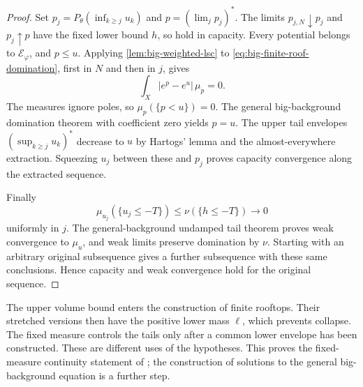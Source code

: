 \begin{proof}
Set $p_j=P_\theta(\inf_{k\geq j}u_k)$ and $p=(\lim_jp_j)^*$. The limits $p_{j,N}\downarrow p_j$ and $p_j\uparrow p$ have the fixed lower bound $h$, so hold in capacity. Every potential belongs to $\mathcal E_\varphi$, and $p\leq u$. Applying \cref{lem:big-weighted-lsc} to \eqref{eq:big-finite-roof-domination}, first in $N$ and then in $j$, gives
\[
 \int_X|e^p-e^u|\,\mu_p=0.
\]
The measures ignore poles, so $\mu_p(\{p<u\})=0$. The general big-background domination theorem with coefficient zero yields $p=u$. The upper tail envelopes $(\sup_{k\geq j}u_k)^*$ decrease to $u$ by Hartogs' lemma and the almost-everywhere extraction. Squeezing $u_j$ between these and $p_j$ proves capacity convergence along the extracted sequence.

Finally
\[
 \mu_{u_j}(\{u_j\leq-T\})\leq\nu(\{h\leq-T\})\longrightarrow0
\]
uniformly in $j$. The general-background undamped tail theorem proves weak convergence to $\mu_u$, and weak limits preserve domination by $\nu$. Starting with an arbitrary original subsequence gives a further subsequence with these same conclusions. Hence capacity and weak convergence hold for the original sequence.
\end{proof}

The upper volume bound enters the construction of finite rooftops. Their stretched versions then have the positive lower mass $\ell$, which prevents collapse. The fixed measure controls the tails only after a common lower envelope has been constructed. These are different uses of the hypotheses. This proves the fixed-measure continuity statement of \cite[Theorem 4.2]{XL26}; the construction of solutions to the general big-background equation is a further step.
